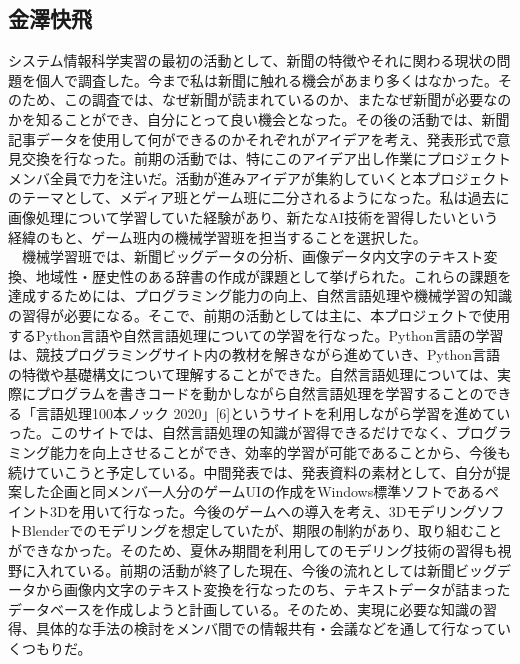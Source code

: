 \subsection{金澤快飛}
システム情報科学実習の最初の活動として、新聞の特徴やそれに関わる現状の問題を個人で調査した。今まで私は新聞に触れる機会があまり多くはなかった。そのため、この調査では、なぜ新聞が読まれているのか、またなぜ新聞が必要なのかを知ることができ、自分にとって良い機会となった。その後の活動では、新聞記事データを使用して何ができるのかそれぞれがアイデアを考え、発表形式で意見交換を行なった。前期の活動では、特にこのアイデア出し作業にプロジェクトメンバ全員で力を注いだ。活動が進みアイデアが集約していくと本プロジェクトのテーマとして、メディア班とゲーム班に二分されるようになった。私は過去に画像処理について学習していた経験があり、新たなAI技術を習得したいという経緯のもと、ゲーム班内の機械学習班を担当することを選択した。\\
　機械学習班では、新聞ビッグデータの分析、画像データ内文字のテキスト変換、地域性・歴史性のある辞書の作成が課題として挙げられた。これらの課題を達成するためには、プログラミング能力の向上、自然言語処理や機械学習の知識の習得が必要になる。そこで、前期の活動としては主に、本プロジェクトで使用するPython言語や自然言語処理についての学習を行なった。Python言語の学習は、競技プログラミングサイト内の教材を解きながら進めていき、Python言語の特徴や基礎構文について理解することができた。自然言語処理については、実際にプログラムを書きコードを動かしながら自然言語処理を学習することのできる「言語処理100本ノック 2020」[6]というサイトを利用しながら学習を進めていった。このサイトでは、自然言語処理の知識が習得できるだけでなく、プログラミング能力を向上させることができ、効率的学習が可能であることから、今後も続けていこうと予定している。中間発表では、発表資料の素材として、自分が提案した企画と同メンバ一人分のゲームUIの作成をWindows標準ソフトであるペイント3Dを用いて行なった。今後のゲームへの導入を考え、3DモデリングソフトBlenderでのモデリングを想定していたが、期限の制約があり、取り組むことができなかった。そのため、夏休み期間を利用してのモデリング技術の習得も視野に入れている。前期の活動が終了した現在、今後の流れとしては新聞ビッグデータから画像内文字のテキスト変換を行なったのち、テキストデータが詰まったデータベースを作成しようと計画している。そのため、実現に必要な知識の習得、具体的な手法の検討をメンバ間での情報共有・会議などを通して行なっていくつもりだ。
